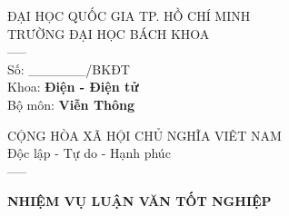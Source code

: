 \documentclass[12pt]{report}
\newcommand{\fontnormal}{\fontsize{8pt}{12pt}\selectfont}
\begin{document}
\newpage
{
\begin{multicols}{2}
	\begin{center}
		\fontnormal
		ĐẠI HỌC QUỐC GIA TP. HỒ CHÍ MINH\\
		TRƯỜNG ĐẠI HỌC BÁCH KHOA\\
		-----\\
		Số: \_\_\_\_\_\_/BKĐT\\
		Khoa: \textbf{Điện - Điện tử}\\
		Bộ môn: \textbf{Viễn Thông}\\
	\end{center}
	\columnbreak
	\begin{center}
		\fontnormal
		CỘNG HÒA XÃ HỘI CHỦ NGHĨA VIÊT NAM\\
		Độc lập - Tự do - Hạnh phúc\\
		-----\\
	\end{center}
\end{multicols}

\begin{center}
{\large \textbf{NHIỆM VỤ LUẬN VĂN TỐT NGHIỆP} \par}
\end{center}

}
\end{document}
